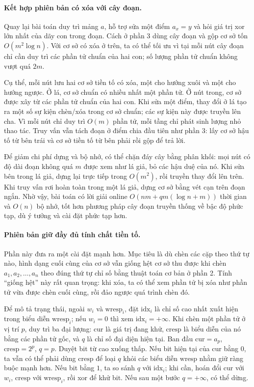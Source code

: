 \documentclass[11pt]{article}
\begin{document}
\paragraph{Kết hợp phiên bản có xóa với cây đoạn.}
Quay lại bài toán duy trì mảng \(a\), hỗ trợ sửa một điểm \(a_x=y\) và hỏi giá
trị xor lớn nhất của dãy con trong đoạn. Cách ở phần 3 dùng cây đoạn và gộp cơ
sở tốn \(O(m^2\log n)\). Với cơ sở có xóa ở trên, ta có thể tối ưu vì tại mỗi
nút cây đoạn chỉ cần duy trì các phần tử chuẩn của hai con; số lượng phần tử
chuẩn không vượt quá \(2m\).

Cụ thể, mỗi nút lưu hai cơ sở tiền tố có xóa, một cho hướng xuôi và một cho
hướng ngược. Ở lá, cơ sở chuẩn có nhiều nhất một phần tử. Ở nút trong, cơ sở
được xây từ các phần tử chuẩn của hai con. Khi sửa một điểm, thay đổi ở lá tạo
ra một số sự kiện chèn/xóa trong cơ sở chuẩn; các sự kiện này được truyền lên
cha. Vì mỗi nút chỉ duy trì \(O(m)\) phần tử, mỗi tầng chỉ phát sinh lượng nhỏ
thao tác. Truy vấn vẫn tách đoạn ở điểm chia đầu tiên như phần 3: lấy cơ sở
hậu tố từ bên trái và cơ sở tiền tố từ bên phải rồi gộp để trả lời.

Để giảm chi phí dựng và bộ nhớ, có thể chặn đáy cây bằng phân khối: mọi nút có
độ dài đoạn không quá \(m\) được xem như lá giả, bỏ các hậu duệ của nó. Khi sửa
bên trong lá giả, dựng lại trực tiếp trong \(O(m^2)\), rồi truyền thay đổi lên
trên. Khi truy vấn rơi hoàn toàn trong một lá giả, dựng cơ sở bằng vét cạn trên
đoạn ngắn. Nhờ vậy, bài toán có lời giải online
\(O(nm+qm(\log n+m))\) thời gian và \(O(n)\) bộ nhớ, tốt hơn phương pháp cây
đoạn truyền thống về bậc độ phức tạp, dù ý tưởng và cài đặt phức tạp hơn.

\paragraph{Phiên bản giữ đầy đủ tính chất tiền tố.}
Phần này đưa ra một cài đặt mạnh hơn. Mục tiêu là dù chèn các cặp theo thứ tự
nào, hình dạng cuối cùng của cơ sở vẫn giống hệt cơ sở thu được khi chèn
\(a_1,a_2,\ldots,a_n\) theo đúng thứ tự chỉ số bằng thuật toán cơ bản ở phần 2.
Tính ``giống hệt'' này rất quan trọng: khi xóa, ta có thể xem phần tử bị xóa
như phần tử vừa được chèn cuối cùng, rồi đảo ngược quá trình chèn đó.

Để mô tả trạng thái, ngoài \(w_i\) và \(\mathrm{wresp}_i\), đặt
\(\mathrm{idx}_i\) là chỉ số cao nhất xuất hiện trong biểu diễn
\(\mathrm{wresp}_i\); nếu \(w_i=0\) thì xem \(\mathrm{idx}_i=+\infty\). Khi
chèn một phần tử ở vị trí \(p\), duy trì ba đại lượng: \(\mathrm{cur}\) là giá
trị đang khử, \(\mathrm{cresp}\) là biểu diễn của nó bằng các phần tử gốc, và
\(q\) là chỉ số đại diện hiện tại. Ban đầu
\(\mathrm{cur}=a_p\), \(\mathrm{cresp}=2^p\), \(q=p\). Duyệt bit từ cao xuống
thấp. Nếu bit hiện tại của \(\mathrm{cur}\) bằng \(0\), ta vẫn có thể phải dùng
\(\mathrm{cresp}\) để loại \(q\) khỏi các biểu diễn \(\mathrm{wresp}\) nhằm
giữ ràng buộc mạnh hơn. Nếu bit bằng \(1\), ta so sánh \(q\) với
\(\mathrm{idx}_i\); khi cần, hoán đổi \(\mathrm{cur}\) với \(w_i\),
\(\mathrm{cresp}\) với \(\mathrm{wresp}_i\), rồi xor để khử bit. Nếu sau một
bước \(q=+\infty\), có thể dừng.
\end{document}
